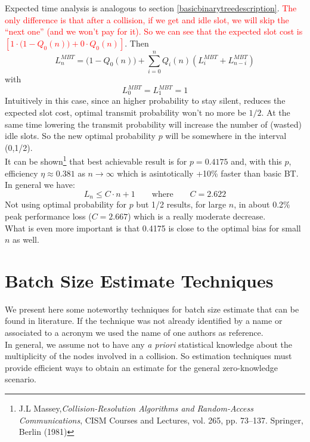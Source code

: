 \documentclass[12pt,a4paper]{report}
\begin{document}
Expected time analysis is analogous  to section \ref{basicbinarytreedescription}. \textcolor{red}{The only difference is that after a collision, if we get and idle slot, we will skip the ``next one'' (and we won't pay for it). So we can see that the expected slot cost is $\left[1 \cdot \bigl(1-Q_{0}(n)\bigr)+ 0\cdot Q_{0}(n)\right]$}. Then\\
\begin{equation}
L_{n}^{MBT} = \bigl(1 - Q_{0}(n)\bigr)+\sum_{i=0}^{n} Q_{i}(n) (L_{i}^{MBT}+L_{n-i}^{MBT})
\end{equation}
with
\begin{equation*}
L_{0}^{MBT} = L_{1}^{MBT}  = 1
\end{equation*}
Intuitively in this case, since an higher probability to stay silent, reduces the expected slot cost, optimal transmit probability won't no more be $1/2$. At the same time lowering the transmit probability will increase the number of (wasted) idle slots. So the new optimal probability $p$ will be somewhere in the interval (0,1/2).\\
It can be shown\footnote{  J.L Massey,\emph{Collision-Resolution Algorithms and Random-Access Communications}, CISM Courses and Lectures, vol. 265, pp. 73–137. Springer, Berlin (1981)} that best achievable result is for $p=0.4175$ and, with this $p$, efficiency $\eta \approx 0.381$ as $n \to \infty$ which is asintotically +10\% faster than basic BT.\\
In general we have: 
\begin{equation}
L_{n}\leq C \cdot n +1 \qquad \textrm{where} \qquad C=2.622
\end{equation}
Not using optimal probability for $p$ but 1/2 results, for large $n$, in about 0.2\% peak performance loss  ($C=2.667$) which is a really moderate decrease.\\
What is even more important  is that 0.4175 is close to the optimal bias for small $n$ as well.
\chapter{Batch Size Estimate Techniques}
\label{ch:Batch Size Estimate Techniques}
We present here some noteworthy techniques for batch size estimate that can be found in literature.
If the technique was not already identified by a name or associated to a acronym we used the name of one authors as reference.\\

In general, we assume not to have any \emph{a priori} statistical knowledge about the multiplicity of the nodes involved in a collision. So estimation techniques must provide efficient ways to obtain an estimate for the general zero-knowledge scenario.\\
\end{document}
